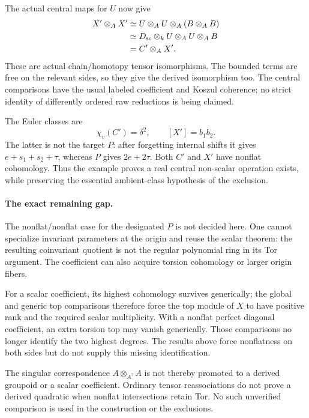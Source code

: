 The actual central maps for \(U\) now give
\begin{align}\label{eq:centralCoefficientActualExample}
 X'\otimes_A X'
 &\simeq U\otimes_A U\otimes_A(B\otimes_A B)\notag\\
 &\simeq D_{\mathrm{sc}}\otimes_k U\otimes_A U\otimes_A B\notag\\
 &=C'\otimes_A X'.
\end{align}
These are actual chain/homotopy tensor isomorphisms.
The bounded terms are free on the relevant sides,
so they give the derived isomorphism too.
The central comparisons have the usual labeled
coefficient and Koszul coherence; no strict
identity of differently ordered raw reductions
is being claimed.

The Euler classes are
\[
                     \chi_v(C')=\delta^2,
                     \qquad [X']=b_1b_2.
\]
The latter is not the target \(P\): after forgetting
internal shifts it gives \(e+s_1+s_2+\tau\), whereas
\(P\) gives \(2e+2\tau\).
Both \(C'\) and \(X'\) have nonflat cohomology.
Thus the example proves a real central non-scalar
operation exists, while preserving the essential
ambient-class hypothesis of the exclusion.

\paragraph{The exact remaining gap.}
The nonflat/nonflat case for the designated \(P\)
is not decided here. One cannot specialize invariant
parameters at the origin and reuse the scalar theorem:
the resulting coinvariant quotient is not the
regular polynomial ring in its Tor argument.
The coefficient can also acquire torsion cohomology
or larger origin fibers.

For a scalar coefficient, its highest cohomology
survives generically; the global and generic top
comparisons therefore force the top module of \(X\)
to have positive rank and the required scalar
multiplicity. With a nonflat perfect diagonal
coefficient, an extra torsion top may vanish
generically. Those comparisons no longer identify
the two highest degrees. The results above force
nonflatness on both sides but do not supply this
missing identification.

The singular correspondence
\(A\otimes_{A^\tau}A\) is not thereby promoted to
a derived groupoid or a scalar coefficient.
Ordinary tensor reassociations do not prove a
derived quadratic when nonflat intersections
retain Tor. No such unverified comparison is
used in the construction or the exclusions.


